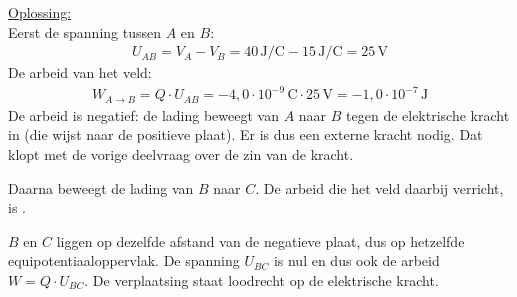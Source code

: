 \documentclass{ximera}
\begin{document}
\begin{exercise}
\begin{question}
\begin{solution}
            \underline{Oplossing:}\\
            Eerst de spanning tussen $A$ en $B$:
            \begin{align*}
                U_{AB} = V_A - V_B = 40 \, \mathrm{J/C} - 15 \, \mathrm{J/C} = 25 \, \mathrm{V}
            \end{align*}
            De arbeid van het veld:
            \begin{align*}
                W_{A \to B} = Q \cdot U_{AB} = -4{,}0 \cdot 10^{-9} \, \mathrm{C} \cdot 25 \, \mathrm{V} = \boxed{-1{,}0 \cdot 10^{-7} \, \mathrm{J}}
            \end{align*}
            De arbeid is negatief: de lading beweegt van $A$ naar $B$ tegen de elektrische kracht in (die wijst naar de positieve plaat). Er is dus een externe kracht nodig. Dat klopt met de vorige deelvraag over de zin van de kracht.
        \end{solution}
    \end{question}

    \begin{question}
        Daarna beweegt de lading van $B$ naar $C$. De arbeid die het veld daarbij verricht, is
        .

        \begin{solution}\nl
            $B$ en $C$ liggen op dezelfde afstand van de negatieve plaat, dus op hetzelfde equipotentiaaloppervlak. De spanning $U_{BC}$ is nul en dus ook de arbeid $W = Q \cdot U_{BC}$. De verplaatsing staat loodrecht op de elektrische kracht.
        \end{solution}
    \end{question}
\end{exercise}
\end{document}
